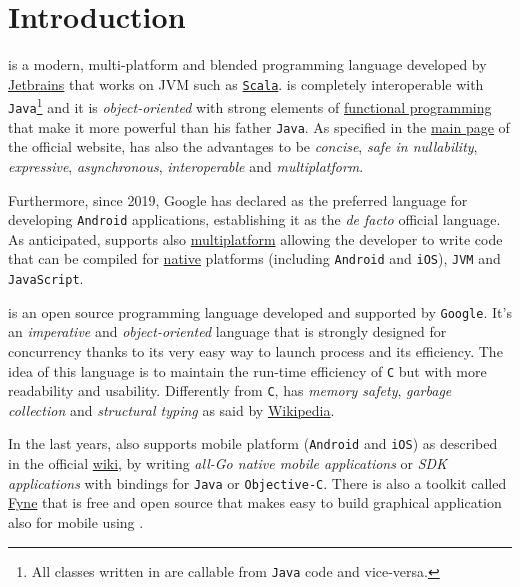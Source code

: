 \section{Introduction}

\Kotlin is a modern, multi-platform and blended programming language developed by \href{https://www.jetbrains.com/}{Jetbrains} that works on JVM such as \href{www.scala-lang.org}{\texttt{Scala}}.
\Kotlin is completely interoperable with \texttt{Java}\footnote{All classes written in \Kotlin are callable from \texttt{Java} code and vice-versa.} and it is \textit{object-oriented} with strong elements of \href{https://en.wikipedia.org/wiki/Functional_programming}{functional programming} that make it more powerful than his father \texttt{Java}.
As specified in the \href{https://kotlinlang.org/#why-kotlin}{main page} of the official website, \Kotlin has also the advantages to be \textit{concise}, \textit{safe in nullability}, \textit{expressive}, \textit{asynchronous}, \textit{interoperable} and \textit{multiplatform}.

Furthermore, since 2019, Google has declared \Kotlin as the preferred language for developing \texttt{Android} applications, establishing it as the \textit{de facto} official language. As anticipated, \Kotlin supports also \href{https://kotlinlang.org/docs/multiplatform.html}{multiplatform} allowing the developer to write \Kotlin code that can be compiled for \href{https://kotlinlang.org/docs/native-overview.html}{native} platforms (including \texttt{Android} and \texttt{iOS}), \texttt{JVM} and \texttt{JavaScript}.

\Go is an open source programming language developed and supported by \texttt{Google}.
It's an \textit{imperative} and \textit{object-oriented} language that is strongly designed for concurrency thanks to its very easy way to launch process and its efficiency.
The idea of this language is to maintain the run-time efficiency of \texttt{C} but with more readability and usability. Differently from \texttt{C}, \Go has \textit{memory safety}, \textit{garbage collection} and \textit{structural typing} as said by \href{https://en.wikipedia.org/wiki/Go_(programming_language)}{Wikipedia}.

In the last years, \Go also supports mobile platform (\texttt{Android} and \texttt{iOS}) as described in the official \href{https://github.com/golang/go/wiki/Mobile}{wiki}, by writing \textit{all-Go native mobile applications} or \textit{SDK applications} with bindings for \texttt{Java} or \texttt{Objective-C}.
There is also a toolkit called \href{https://fyne.io/}{Fyne} that is free and open source that makes easy to build graphical application also for mobile using \Go.

